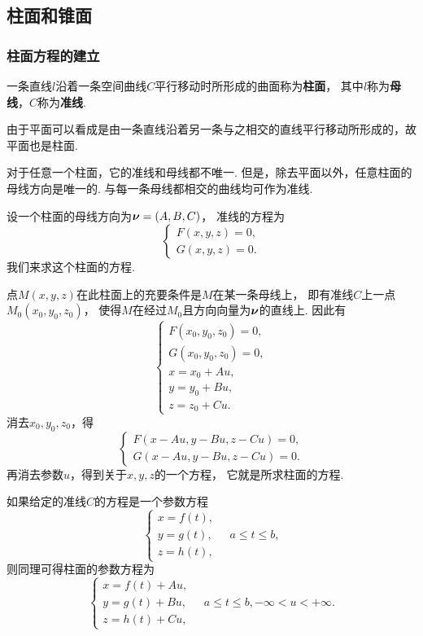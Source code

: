 \subsection{柱面和锥面}
\subsubsection{柱面方程的建立}
一条直线\(l\)沿着一条空间曲线\(C\)平行移动时所形成的曲面称为\textbf{柱面}，
其中\(l\)称为\textbf{母线}，\(C\)称为\textbf{准线}.

由于平面可以看成是由一条直线沿着另一条与之相交的直线平行移动所形成的，故平面也是柱面.

对于任意一个柱面，它的准线和母线都不唯一.
但是，除去平面以外，任意柱面的母线方向是唯一的.
与每一条母线都相交的曲线均可作为准线.

设一个柱面的母线方向为\(\boldsymbol{\nu}=(A,B,C)\)，
准线的方程为\[
	\left\{ \begin{array}{l}
		F(x,y,z) = 0, \\
		G(x,y,z) = 0.
	\end{array} \right.
\]
我们来求这个柱面的方程.

点\(M(x,y,z)\)在此柱面上的充要条件是\(M\)在某一条母线上，
即有准线\(C\)上一点\(M_0(x_0,y_0,z_0)\)，
使得\(M\)在经过\(M_0\)且方向向量为\(\boldsymbol{\nu}\)的直线上.
因此有\[
	\left\{ \begin{array}{l}
		F(x_0,y_0,z_0) = 0, \\
		G(x_0,y_0,z_0) = 0, \\
		x = x_0 + Au, \\
		y = y_0 + Bu, \\
		z = z_0 + Cu.
	\end{array} \right.
\]
消去\(x_0,y_0,z_0\)，得\[
	\left\{ \begin{array}{l}
		F(x - Au,y - Bu,z - Cu) = 0, \\
		G(x - Au,y - Bu,z - Cu) = 0.
	\end{array} \right.
\]
再消去参数\(u\)，得到关于\(x,y,z\)的一个方程，
它就是所求柱面的方程.

如果给定的准线\(C\)的方程是一个参数方程\[
	\left\{ \begin{array}{l}
		x = f(t), \\
		y = g(t), \\
		z = h(t),
	\end{array} \right.
	\quad a \leqslant t \leqslant b,
\]
则同理可得柱面的参数方程为\[
	\left\{ \begin{array}{l}
		x = f(t) + Au, \\
		y = g(t) + Bu, \\
		z = h(t) + Cu,
	\end{array} \right.
	\quad
	a \leqslant t \leqslant b,
	-\infty < u < +\infty.
\]

